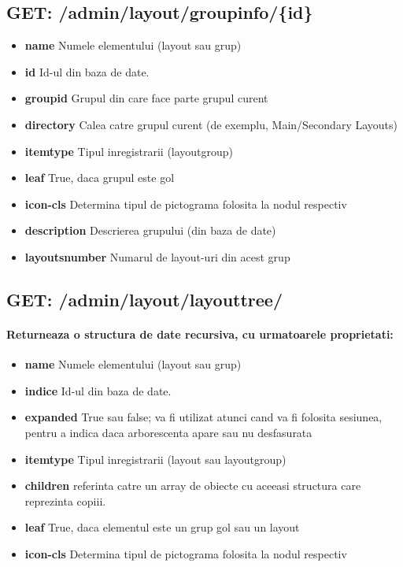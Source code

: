  \subsection*{GET: /admin/layout/groupinfo/\{id\}}

\begin{itemize}
\item \textbf{name}
 Numele elementului (layout sau grup)
\item \textbf{id}
 Id-ul din baza de date. 
\item \textbf{groupid}
 Grupul din care face parte grupul curent 
\item \textbf{directory}
 Calea catre grupul curent (de exemplu, Main/Secondary Layouts)
\item \textbf{itemtype}
 Tipul inregistrarii (layoutgroup)
\item \textbf{leaf}
 True, daca grupul este gol
\item \textbf{icon-cls}
 Determina tipul de pictograma folosita la nodul respectiv 
\item \textbf{description}
 Descrierea grupului (din baza de date)
\item \textbf{layoutsnumber}
 Numarul de layout-uri din acest grup
 \end{itemize}
 \subsection*{GET: /admin/layout/layouttree/}

\paragraph{Returneaza o structura de date recursiva, cu urmatoarele proprietati:}
\begin{itemize}
\item \textbf{name}
 Numele elementului (layout sau grup)
\item \textbf{indice}
 Id-ul din baza de date. 
\item \textbf{expanded}
 True sau false; va fi utilizat atunci cand va fi folosita sesiunea, pentru a indica daca arborescenta apare sau nu desfasurata
\item \textbf{itemtype}
 Tipul inregistrarii (layout sau layoutgroup)
\item \textbf{children}
 referinta catre un array de obiecte cu aceeasi structura care reprezinta copiii.
\item \textbf{leaf}
 True, daca elementul este un grup gol sau un layout
\item \textbf{icon-cls}
 Determina tipul de pictograma folosita la nodul respectiv
 \end{itemize}
